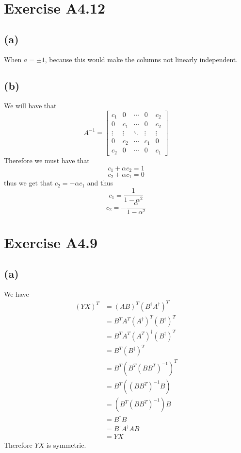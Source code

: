 \section*{Exercise A4.12}
\subsection*{(a)}
When $a=\pm1$, because this would make the columns not linearly independent.
\subsection*{(b)}
We will have that 
$$A^{-1}=\begin{bmatrix}
    c_1 & 0 & \cdots & 0 & c_2\\
    0 & c_1 & \cdots & 0 & c_2\\
    \vdots & \vdots & \ddots & \vdots & \vdots\\
    0 & c_2 & \cdots & c_1 & 0\\
    c_2 & 0 & \cdots & 0 & c_1
\end{bmatrix}$$
Therefore we must have that 
$$c_1+\alpha c_2=1$$
$$c_2+\alpha c_1=0$$
thus we get that $c_2=-\alpha c_1$ and thus
$$c_1=\frac{1}{1-\alpha^2}$$
$$c_2=-\frac{\alpha}{1-\alpha^2}$$
\section*{Exercise A4.9}
\subsection*{(a)}
We have 
\begin{align*}
    (YX)^T&=\left(AB\right)^T\left(B^{\dagger}A^{\dagger}\right)^T\\
    &=B^TA^T\left(A^{\dagger}\right)^T\left(B^{\dagger}\right)^T\\
    &=B^TA^T\left(A^T\right)^{\dagger}\left(B^{\dagger}\right)^T\\
    &=B^T\left(B^{\dagger}\right)^T\\
    &=B^T\left(B^T(BB^T)^{-1}\right)^T\\
    &=B^T\left((BB^T)^{-1}B\right)\\
    &=\left(B^T(BB^T)^{-1}\right)B\\
    &=B^{\dagger}B\\
    &=B^{\dagger}A^{\dagger}AB\\
    &=YX
\end{align*}
Therefore $YX$ is symmetric.
